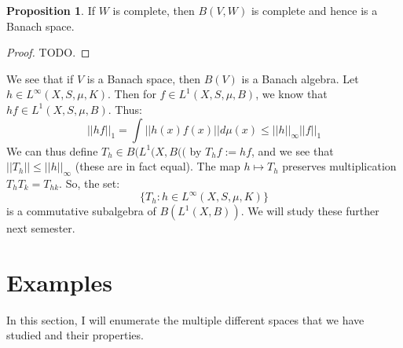 \documentclass[11pt, oneside]{amsart}   	%
\theoremstyle{definition}
\newtheorem{prop}{Proposition}[section]
\begin{document}
	\begin{prop}
		If $W$ is complete, then $B(V, W)$ is complete and hence is a Banach space. 
	\end{prop}
	
	\begin{proof}
		TODO.
	\end{proof}
	
	We see that if $V$ is a Banach space, then $B(V)$ is a Banach algebra. Let $h\in L^\infty (X, S, \mu, K)$. Then for $f\in
	L^1(X, S, \mu, B)$, we know that $hf\in L^1(X, S, \mu, B)$. Thus:
	$$
		||hf||_1 = \int ||h(x)f(x)||d\mu(x)\leq ||h||_\infty ||f||_1
	$$
	We can thus define $T_h\in B(L^1(X, B(($ by $T_hf := hf$, and we see that $||T_h||\leq ||h||_\infty$ (these are in fact 
	equal). The map $h\mapsto T_h$ preserves multiplication $T_hT_k = T_{hk}$. So, the set:
	$$
		\{T_h : h\in L^\infty(X, S, \mu, K)\}
	$$
	is a commutative subalgebra of $B(L^1(X, B))$. We will study these further next semester.
	
\section{Examples}

	In this section, I will enumerate the multiple different spaces that we have studied and their properties.
	
\end{document}
